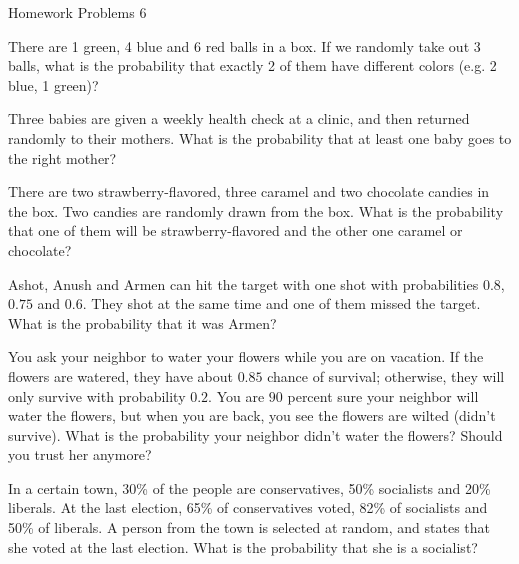  \begin{center}\begin{large} Homework Problems 6
 \end{large}\end{center}
 \bigskip


\begin{problem}[0.5 points]
There are 1 green, 4 blue and 6 red balls in a box. If we randomly
take out 3 balls, what is the probability that exactly 2 of them have
different colors (e.g. 2 blue, 1 green)?

\end{problem}
\bigskip

\begin{problem}[0.5 points]
    Three babies are given a weekly health check at a clinic, and then returned randomly to their mothers. What is the probability that at least one baby goes to the right mother?
\end{problem}

\bigskip

\begin{problem}[0.5 points]
    There are two strawberry-flavored, three caramel and two chocolate candies in the box. Two candies are randomly drawn from the box. What is the probability that one of them will be strawberry-flavored and the other one caramel or chocolate?
\end{problem}
\bigskip
\begin{problem}[1 point]
Ashot, Anush and Armen can hit the target with one shot with probabilities $0.8$, $0.75$ and $0.6$. They shot at the same time and one of them missed the target. What is the probability that it was Armen?
\end{problem}
\bigskip


\begin{problem}[1 point]
You ask your neighbor to water your flowers while you are on vacation. If the flowers are watered, they have about $0.85$ chance of survival; otherwise, they will only survive with probability $0.2$. You are $90$ percent sure your neighbor will water the flowers, but when you are back, you see the flowers are wilted (didn't survive). What is the probability your neighbor didn't water the flowers? Should you trust her anymore? 
\end{problem}

\bigskip


\begin{problem}[1 point]
In a certain town, 30\% of the people are conservatives, 50\% socialists and 20\% liberals. At the last election, 65\% of conservatives voted, 82\% of socialists and 50\% of liberals. A person from the town is selected at random, and states that she voted at the last election. What is
the probability that she is a socialist?
\end{problem}

